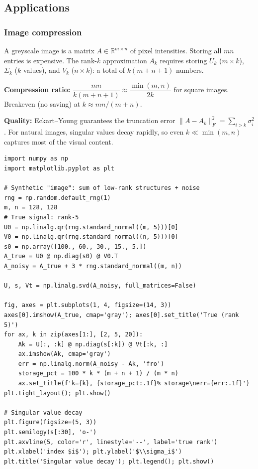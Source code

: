 \documentclass[11pt]{article}
\theoremstyle{definition}
\theoremstyle{plain}
\begin{document}
\subsection{Applications}

\subsubsection{Image compression}

A greyscale image is a matrix $A\in\mathbb{R}^{m\times n}$ of pixel intensities.
Storing all $mn$ entries is expensive.  The rank-$k$ approximation $A_k$
requires storing $U_k$ ($m\times k$), $\Sigma_k$ ($k$ values), and $V_k$
($n\times k$): a total of $k(m+n+1)$ numbers.

\medskip\noindent
\textbf{Compression ratio:} $\dfrac{mn}{k(m+n+1)} \approx \dfrac{\min(m,n)}{2k}$
for square images.  Breakeven (no saving) at $k \approx mn/(m+n)$.

\medskip\noindent
\textbf{Quality:} Eckart--Young guarantees the truncation error $\|A-A_k\|_F^2 =
\sum_{i>k}\sigma_i^2$.  For natural images, singular values decay rapidly, so
even $k\ll \min(m,n)$ captures most of the visual content.

\begin{lstlisting}
import numpy as np
import matplotlib.pyplot as plt

# Synthetic "image": sum of low-rank structures + noise
rng = np.random.default_rng(1)
m, n = 128, 128
# True signal: rank-5
U0 = np.linalg.qr(rng.standard_normal((m, 5)))[0]
V0 = np.linalg.qr(rng.standard_normal((n, 5)))[0]
s0 = np.array([100., 60., 30., 15., 5.])
A_true = U0 @ np.diag(s0) @ V0.T
A_noisy = A_true + 3 * rng.standard_normal((m, n))

U, s, Vt = np.linalg.svd(A_noisy, full_matrices=False)

fig, axes = plt.subplots(1, 4, figsize=(14, 3))
axes[0].imshow(A_true, cmap='gray'); axes[0].set_title('True (rank 5)')
for ax, k in zip(axes[1:], [2, 5, 20]):
    Ak = U[:, :k] @ np.diag(s[:k]) @ Vt[:k, :]
    ax.imshow(Ak, cmap='gray')
    err = np.linalg.norm(A_noisy - Ak, 'fro')
    storage_pct = 100 * k * (m + n + 1) / (m * n)
    ax.set_title(f'k={k}, {storage_pct:.1f}% storage\nerr={err:.1f}')
plt.tight_layout(); plt.show()

# Singular value decay
plt.figure(figsize=(5, 3))
plt.semilogy(s[:30], 'o-')
plt.axvline(5, color='r', linestyle='--', label='true rank')
plt.xlabel('index $i$'); plt.ylabel('$\\sigma_i$')
plt.title('Singular value decay'); plt.legend(); plt.show()
\end{lstlisting}
\end{document}
